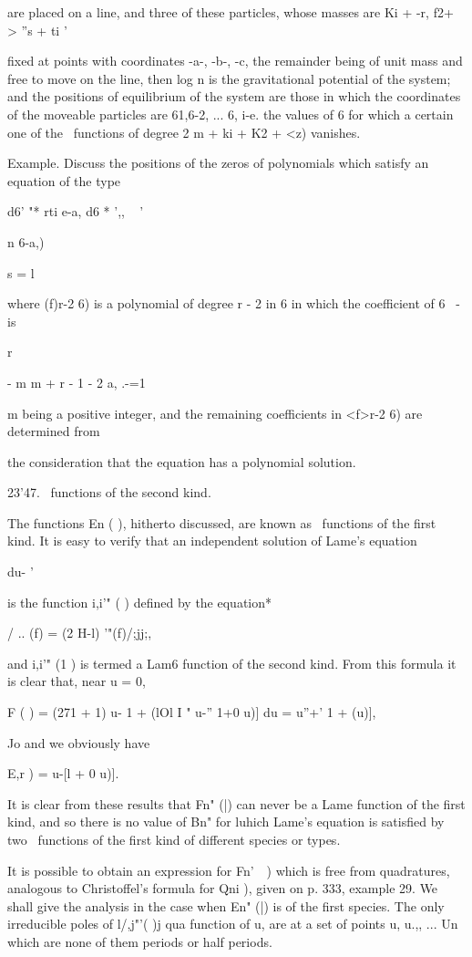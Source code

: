 {{{{{{{are placed on a line, and three of these particles, whose masses are
Ki + -r, f2+ > ''s + ti '

fixed at points with coordinates -a-, -b-, -c, the remainder being of
unit mass and free to move on the line, then log n is the
gravitational potential of the system; and the positions of
equilibrium of the system are those in which the coordinates of the
moveable particles are 61,6-2, ... 6, i-e. the values of 6 for which
a certain one of the \Lame\ functions of degree 2 m + ki + K2 + <z)
vanishes.

Example. Discuss the positions of the zeros of polynomials which
satisfy an equation of the type

d6' "* rti e-a, d6 * ',, ~ '

n 6-a,)

s = l

where (f)r-2 6) is a polynomial of degree r - 2 in 6 in which the
coefficient of 6 ~- is

r

- m m + r - 1 - 2 a, .-=1

m being a positive integer, and the remaining coefficients in <f>r-2
6) are determined from

the consideration that the equation has a polynomial solution.


23'47. \Lame\ functions of the second kind.

The functions En ( ), hitherto discussed, are known as \Lame\ functions
of the first kind. It is easy to verify that an independent solution
of Lame's equation

du- '

is the function i,i'" ( ) defined by the equation*

/ .. (f) = (2 H-l) '"(f)/;jj;,

and i,i'" (1 ) is termed a Lam6 function of the second kind. From
this formula it is clear that, near u = 0,

F ( ) = (271 + 1) u- 1 + (lOl I " u-'' 1+0 u)] du = u''+' 1 + (u)],

Jo and we obviously have

E,r ) = u-[l + 0 u)].

It is clear from these results that Fn" (|) can never be a Lame
function of the first kind, and so there is no value of Bn" for luhich
Lame's equation is satisfied by two \Lame\ functions of the first kind
of different species or types.

It is possible to obtain an expression for Fn'\ \ ) which is free from
quadratures, analogous to Christoffel's formula for Qni ), given on p.
333, example 29. We shall give the analysis in the case when En" (|)
is of the first species. The only irreducible poles of l/,j"'( )j qua
function of u, are at a set of points u, u.,, ... Un which are none
of them periods or half periods.

}}}}}}}
